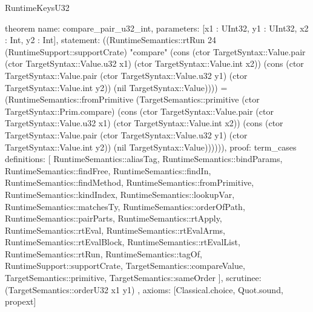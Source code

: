 \begin{lexlean}{RuntimeKeysU32}
\begin{semanticmodule}
theorem{
  name: compare_pair_u32_int,
  parameters: [x1 : UInt32, y1 : UInt32, x2 : Int, y2 : Int],
  statement: ((RuntimeSemantics::rtRun 24 (RuntimeSupport::supportCrate) "compare" (cons (ctor TargetSyntax::Value.pair (ctor TargetSyntax::Value.u32 x1) (ctor TargetSyntax::Value.int x2)) (cons (ctor TargetSyntax::Value.pair (ctor TargetSyntax::Value.u32 y1) (ctor TargetSyntax::Value.int y2)) (nil TargetSyntax::Value)))) = (RuntimeSemantics::fromPrimitive (TargetSemantics::primitive (ctor TargetSyntax::Prim.compare) (cons (ctor TargetSyntax::Value.pair (ctor TargetSyntax::Value.u32 x1) (ctor TargetSyntax::Value.int x2)) (cons (ctor TargetSyntax::Value.pair (ctor TargetSyntax::Value.u32 y1) (ctor TargetSyntax::Value.int y2)) (nil TargetSyntax::Value)))))),
  proof: term_cases{
    definitions: [
      RuntimeSemantics::aliasTag,
      RuntimeSemantics::bindParams,
      RuntimeSemantics::findFree,
      RuntimeSemantics::findIn,
      RuntimeSemantics::findMethod,
      RuntimeSemantics::fromPrimitive,
      RuntimeSemantics::kindIndex,
      RuntimeSemantics::lookupVar,
      RuntimeSemantics::matchesTy,
      RuntimeSemantics::orderOfPath,
      RuntimeSemantics::pairParts,
      RuntimeSemantics::rtApply,
      RuntimeSemantics::rtEval,
      RuntimeSemantics::rtEvalArms,
      RuntimeSemantics::rtEvalBlock,
      RuntimeSemantics::rtEvalList,
      RuntimeSemantics::rtRun,
      RuntimeSemantics::tagOf,
      RuntimeSupport::supportCrate,
      TargetSemantics::compareValue,
      TargetSemantics::primitive,
      TargetSemantics::sameOrder
    ],
    scrutinee: (TargetSemantics::orderU32 x1 y1)
  },
  axioms: [Classical.choice, Quot.sound, propext]
}


\end{semanticmodule}
\end{lexlean}
